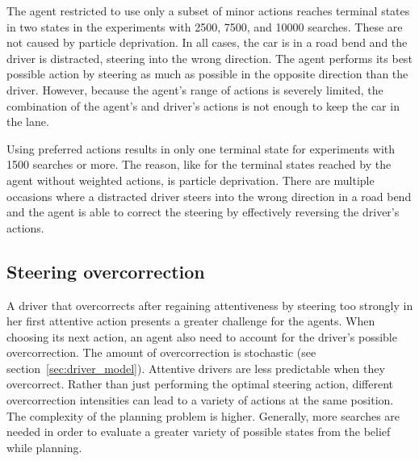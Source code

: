 The agent restricted to use only a subset of minor actions reaches terminal states in two states in the experiments with 2500, 7500, and 10000 searches. These are not caused by particle deprivation. In all cases, the car is in a road bend and the driver is distracted, steering into the wrong direction. The agent performs its best possible action by steering as much as possible in the opposite direction than the driver. However, because the agent's range of actions is severely limited, the combination of the agent's and driver's actions is not enough to keep the car in the lane. 

Using preferred actions results in only one terminal state for experiments with 1500 searches or more. The reason, like for the terminal states reached by the agent without weighted actions, is particle deprivation. There are multiple occasions where a distracted driver steers into the wrong direction in a road bend and the agent is able to correct the steering by effectively reversing the driver's actions.





\subsection{Steering overcorrection}

A driver that overcorrects after regaining attentiveness by steering too strongly in her first attentive action presents a greater challenge for the agents. When choosing its next action, an agent also need to account for the driver's possible overcorrection. The amount of overcorrection is stochastic (see section~\ref{sec:driver_model}). Attentive drivers are less predictable when they overcorrect. Rather than just performing the optimal steering action, different overcorrection intensities can lead to a variety of actions at the same position. The complexity of the planning problem is higher. Generally, more searches are needed in order to evaluate a greater variety of possible states from the belief while planning.



